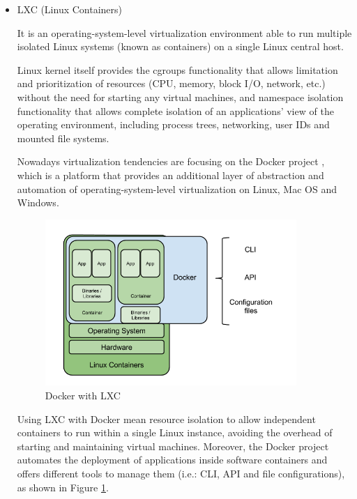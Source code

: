 \begin{itemize}
\item LXC (Linux Containers) \cite{lxc}\hfill

It is an operating-system-level virtualization environment able to run multiple isolated Linux systems (known as containers) on a single Linux central host.

Linux kernel itself provides the cgroups functionality that allows limitation and prioritization of resources (CPU, memory, block I/O, network, etc.) without the need for starting any virtual machines, and namespace isolation functionality that allows complete isolation of an applications' view of the operating environment, including process trees, networking, user IDs and mounted file systems.

Nowadays virtualization tendencies are focusing on the Docker project \cite{docker}, which is a platform that provides an additional layer of abstraction and automation of operating-system-level virtualization on Linux, Mac OS and Windows.
\begin{figure}[!htb]
\begin{center}
\includegraphics[width=0.9\textwidth]{./images/LXC.png}
\caption{Docker with LXC}
\label{F:DockerAndLXC}
\end{center}
\end{figure}

Using LXC with Docker mean resource isolation to allow independent containers to run within a single Linux instance, avoiding the overhead of starting and maintaining virtual machines. Moreover, the Docker project automates the deployment of applications inside software containers and offers different tools to manage them (i.e.: CLI, API and file configurations), as shown in Figure \ref{F:DockerAndLXC}. 
\end{itemize}

